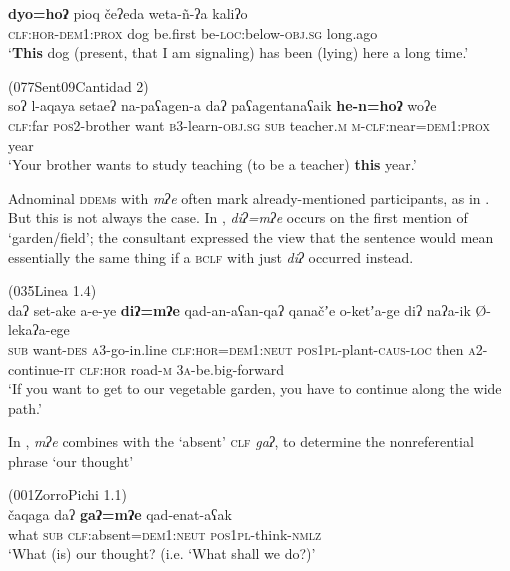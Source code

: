 \documentclass[output=paper,colorlinks,citecolor=brown]{langscibook}
\begin{document}
\ea\label{ex:payne:65}
\gll  \textbf{dyo=hoʔ}  pioq  čeʔeda  weta-ñ-ʔa  kaliʔo\\
\textsc{clf:hor-dem1:prox}  dog be.first  be-\textsc{loc}:below-\textsc{obj.sg}  long.ago\\
\glt ‘\textbf{This} dog (present, that I am signaling) has been (lying) here a long time.’
\z

\ea\label{ex:payne:66} (077Sent09Cantidad 2)\\
\gll  soʔ  l-aqaya  setaeʔ  na-paʕagen-a  daʔ paʕagentanaʕaik  \textbf{he-n=hoʔ}  woʔe\\
\textsc{clf}:far  \textsc{pos2}-brother want \textsc{b3}-learn-\textsc{obj.sg}    \textsc{sub} teacher.\textsc{m}  \textsc{m-clf}:near=\textsc{dem1:prox} year\\
\glt ‘Your brother wants to study teaching (to be a teacher) \textbf{this} year.’ 
\z

Adnominal \textsc{ddem}s with \textit{mʔe} often mark already-mentioned participants, as in . But this is not always the case. In , \textit{diʔ=mʔe} occurs on the first mention of ‘garden/field’; the consultant expressed the view that the sentence would mean essentially the same thing if a \textsc{bclf} with just \textit{diʔ} occurred instead.

\ea\label{ex:payne:67} (035Linea 1.4)\\
\gll  daʔ  set-ake  a-e-ye  \textbf{diʔ=mʔe} qad-an-aʕan-qaʔ  qanačʼe  o-ketʼa-ge diʔ  naʔa-ik  Ø-lekaʔa-ege\\
 \textsc{sub} want-\textsc{des}  \textsc{a3}-go-in.line \textsc{clf:hor=dem1:neut} \textsc{pos1pl}-plant-\textsc{caus-loc} then \textsc{a2}-continue-\textsc{it} \textsc{clf:hor}  road-\textsc{m} \textsc{3a}-be.big-forward\\
\glt ‘If you want to get to our vegetable garden, you have to continue along the wide path.’ 
\z

In , \textit{mʔe} combines with the ‘absent’ \textsc{clf} \textit{gaʔ}, to determine the nonreferential phrase ‘our thought’

\ea\label{ex:payne:68} (001ZorroPichi 1.1)\\
\gll  čaqaga  daʔ  \textbf{gaʔ=mʔe}  qad-enat-aʕak\\
what \textsc{sub}    \textsc{clf}:absent=\textsc{dem1:neut}  \textsc{pos1pl}-think-\textsc{nmlz}\\
\glt ‘What (is) our thought? (i.e. ‘What shall we do?)’ \\
\z
\end{document}
